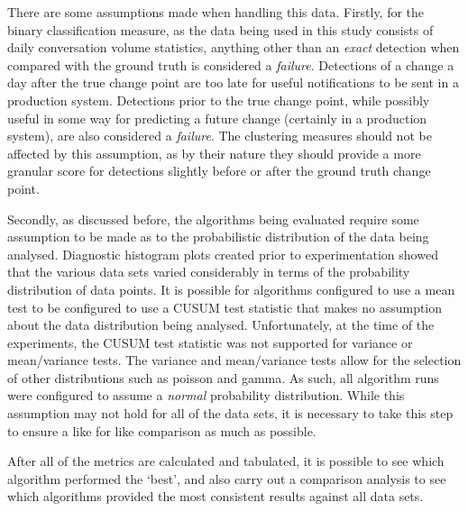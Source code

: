 \documentclass[../main.tex]{subfiles}
\begin{document}
There are some assumptions made when handling this data. Firstly, for the binary classification measure, as the data being used in this study consists of daily conversation volume statistics, anything other than an \emph{exact} detection when compared with the ground truth is considered a \emph{failure}. Detections of a change a day after the true change point are too late for useful notifications to be sent in a production system. Detections prior to the true change point, while possibly useful in some way for predicting a future change (certainly in a production system), are also considered a \emph{failure}. The clustering measures should not be affected by this assumption, as by their nature they should provide a more granular score for detections slightly before or after the ground truth change point.

Secondly, as discussed before, the algorithms being evaluated require some assumption to be made as to the probabilistic distribution of the data being analysed. Diagnostic histogram plots created prior to experimentation showed that the various data sets varied considerably in terms of the probability distribution of data points. It is possible for algorithms configured to use a mean test to be configured to use a CUSUM test statistic that makes no assumption about the data distribution being analysed. Unfortunately, at the time of the experiments, the CUSUM test statistic was not supported for variance or mean/variance tests. The variance and mean/variance tests allow for the selection of other distributions such as poisson and gamma. As such, all algorithm runs were configured to assume a \emph{normal} probability distribution. While this assumption may not hold for all of the data sets, it is necessary to take this step to ensure a like for like comparison as much as possible.

After all of the metrics are calculated and tabulated, it is possible to see which algorithm performed the `best', and also carry out a comparison analysis to see which algorithms provided the most consistent results against all data sets.
\end{document}
